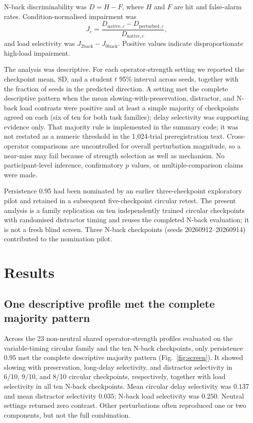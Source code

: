 \documentclass[11pt,reprint,aps,prl,floatfix,secnumarabic]{revtex4-2}
\begin{document}
N-back discriminability was $D=H-F$, where $H$ and $F$ are hit and false-alarm
rates. Condition-normalised impairment was
\begin{equation}
 J_c=\frac{D_{\mathrm{native},c}-D_{\mathrm{perturbed},c}}
 {D_{\mathrm{native},c}},
\end{equation}
and load selectivity was $J_{\mathrm{2back}}-J_{\mathrm{0back}}$. Positive
values indicate disproportionate high-load impairment.

The analysis was descriptive. For each operator-strength setting we reported
the checkpoint mean, SD, and a student $t$ 95\% interval across seeds, together
with the fraction of seeds in the predicted direction. A setting met the
complete descriptive pattern when the mean slowing-with-preservation,
distractor, and N-back load contrasts were positive and at least a simple
majority of checkpoints agreed on each (six of ten for both task families);
delay selectivity was supporting evidence only. That majority rule is
implemented in the summary code; it was not restated as a numeric threshold in
the 1,024-trial preregistration text. Cross-operator comparisons are uncontrolled
for overall perturbation magnitude, so a near-miss may fail because of strength
selection as well as mechanism. No participant-level inference, confirmatory
$p$ values, or multiple-comparison claims were made.

Persistence 0.95 had been nominated by an earlier three-checkpoint exploratory
pilot and retained in a subsequent five-checkpoint circular retest. The present
analysis is a family replication on ten independently trained circular
checkpoints with randomised distractor timing and reuses the completed N-back
evaluation; it is not a fresh blind screen. Three N-back checkpoints (seeds
20260912--20260914) contributed to the nomination pilot.

\section{Results}

\subsection{One descriptive profile met the complete majority pattern}

Across the 23 non-neutral shared operator-strength profiles evaluated on the
variable-timing circular family and the ten N-back checkpoints, only
persistence $0.95$ met the complete descriptive majority pattern
(Fig.~\ref{fig:screen}). It showed slowing with preservation, long-delay
selectivity, and distractor selectivity in 6/10, 9/10, and 8/10 circular
checkpoints, respectively, together with load selectivity in all ten N-back
checkpoints. Mean circular delay selectivity was $0.137$ and mean distractor
selectivity $0.035$; N-back load selectivity was $0.250$. Neutral settings
returned zero contrast. Other perturbations often reproduced one or two
components, but not the full combination.
\end{document}
